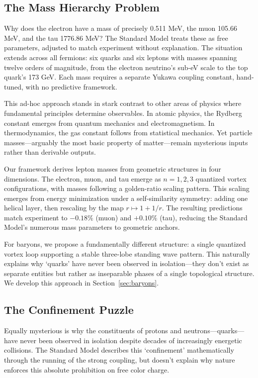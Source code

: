 \subsection{The Mass Hierarchy Problem}

Why does the electron have a mass of precisely 0.511 MeV, the muon 105.66 MeV, and the tau 1776.86 MeV? The Standard Model treats these as free parameters, adjusted to match experiment without explanation. The situation extends across all fermions: six quarks and six leptons with masses spanning twelve orders of magnitude, from the electron neutrino's sub-eV scale to the top quark's 173 GeV. Each mass requires a separate Yukawa coupling constant, hand-tuned, with no predictive framework.

This ad-hoc approach stands in stark contrast to other areas of physics where fundamental principles determine observables. In atomic physics, the Rydberg constant emerges from quantum mechanics and electromagnetism. In thermodynamics, the gas constant follows from statistical mechanics. Yet particle masses---arguably the most basic property of matter---remain mysterious inputs rather than derivable outputs.

Our framework derives lepton masses from geometric structures in four dimensions. The electron, muon, and tau emerge as $n=1,2,3$ quantized vortex configurations, with masses following a golden-ratio scaling pattern. This scaling emerges from energy minimization under a self-similarity symmetry: adding one helical layer, then rescaling by the map $r\mapsto 1+1/r$. The resulting predictions match experiment to $-0.18\%$ (muon) and $+0.10\%$ (tau), reducing the Standard Model's numerous mass parameters to geometric anchors.

For baryons, we propose a fundamentally different structure: a single quantized vortex loop supporting a stable three-lobe standing wave pattern. This naturally explains why `quarks' have never been observed in isolation---they don't exist as separate entities but rather as inseparable phases of a single topological structure. We develop this approach in Section~\ref{sec:baryons}.

\subsection{The Confinement Puzzle}

Equally mysterious is why the constituents of protons and neutrons---quarks---have never been observed in isolation despite decades of increasingly energetic collisions. The Standard Model describes this `confinement' mathematically through the running of the strong coupling, but doesn't explain why nature enforces this absolute prohibition on free color charge.

